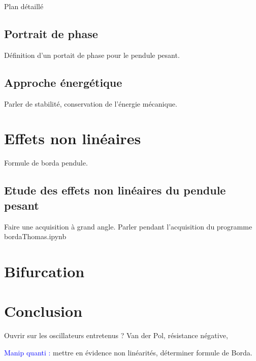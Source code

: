 \begin{reportBlock}{Plan détaillé}
  \subsection{Portrait de phase}
  Définition d'un portait de phase pour le pendule pesant.
  \subsection{Approche énergétique}
  Parler de stabilité, conservation de l'énergie mécanique.  

  \section{Effets non linéaires}
  Formule de borda pendule.\\
  \subsection{Etude des effets non linéaires du pendule pesant}
  Faire une acquisition à grand angle. Parler pendant l'acquisition du programme bordaThomas.ipynb

  \section{Bifurcation}
  \subsection{}
  \section*{Conclusion}
  Ouvrir sur les oscillateurs entretenus ? Van der Pol, résistance négative,

  \textcolor{blue}{Manip quanti :} mettre en évidence non linéarités, déterminer formule de Borda.
  


\end{reportBlock}